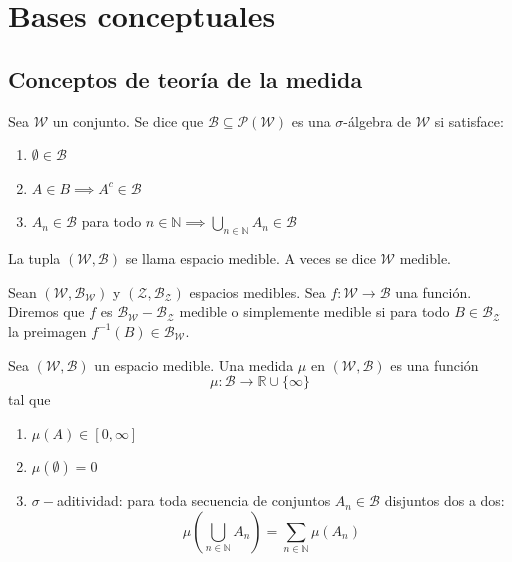 \chapter{Bases conceptuales}
\label{bases-conceptuales}
\section{Conceptos de teoría de la medida}
\begin{defin}
Sea $\mathcal{W}$ un conjunto. Se dice que $\mathcal{B} \subseteq \mathcal{P(\mathcal{W})}$ es una $\sigma$-álgebra de $\mathcal{W}$ si satisface:
\begin{enumerate}
\item $\emptyset \in \mathcal{B}$
\item $A \in B \implies A^c \in \mathcal{B}$
\item $A_n \in \mathcal{B}$ para todo $n \in \mathbb{N} \implies \bigcup_{n \in \mathbb{N}} A_n \in \mathcal{B}$ 
\end{enumerate}

La tupla $(\mathcal{W, B})$ se llama espacio medible. A veces se dice $\mathcal{W}$ medible.
\end{defin}

\begin{defin}
Sean $(\mathcal{W, B_W})$ y $(\mathcal{Z, B_Z})$ espacios medibles. Sea $f: \mathcal{W} \rightarrow \mathcal{B}$ una función. Diremos que $f$ es $\mathcal{B_W-B_Z}$ medible o simplemente medible si para todo $B \in \mathcal{B_Z}$ la preimagen $f^{-1}(B) \in \mathcal{B_W}$.
\end{defin}

\begin{defin}
Sea $(\mathcal{W, B})$ un espacio medible. Una medida $\mu$ en $(\mathcal{W, B})$ es una función
\begin{equation*}
\mu: \mathcal{B} \rightarrow \mathbb{R} \cup \{\infty\}
\end{equation*}
tal que
\begin{enumerate}
\item $\mu(A) \in [0, \infty]$
\item $\mu(\emptyset) = 0$
\item $\sigma-$aditividad: para toda secuencia de conjuntos $A_n \in \mathcal{B}$ disjuntos dos a dos:
\begin{equation*}
\mu\left(\bigcup_{n \in \mathbb{N}}A_n\right) = \sum_{n\in\mathbb{N}} \mu(A_n)
\end{equation*}
\end{enumerate}
\end{defin}

